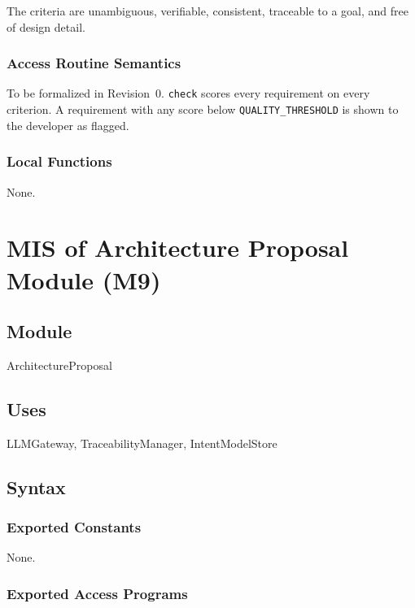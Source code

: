 \documentclass[12pt, titlepage]{article}
\begin{document}
The criteria are unambiguous, verifiable, consistent, traceable to a goal,
and free of design detail.

\subsubsection{Access Routine Semantics}

To be formalized in Revision~0. \texttt{check} scores every requirement on
every criterion. A requirement with any score below
\texttt{QUALITY\_THRESHOLD} is shown to the developer as flagged.

\subsubsection{Local Functions}

None.

\newpage
\section{MIS of Architecture Proposal Module (M9)} \label{MISArch}

\subsection{Module}

ArchitectureProposal

\subsection{Uses}

LLMGateway, TraceabilityManager, IntentModelStore

\subsection{Syntax}

\subsubsection{Exported Constants}

None.

\subsubsection{Exported Access Programs}
\end{document}

